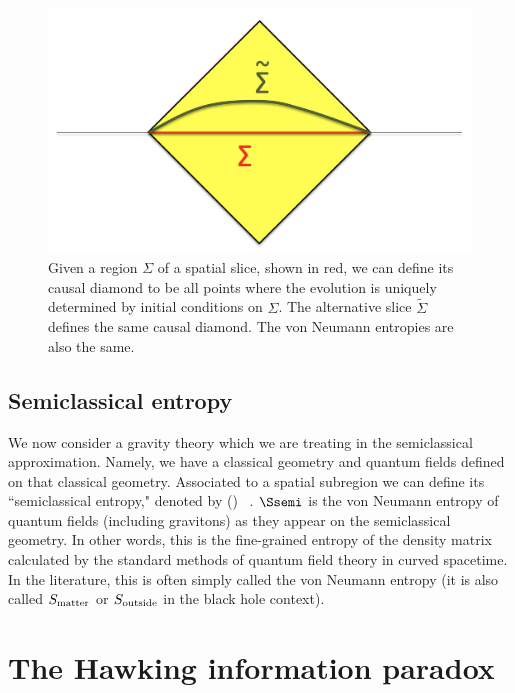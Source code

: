 \begin{figure}[h]
\begin{center}
\includegraphics[scale=.3]{figures/Diamond.png}
\caption{ Given a region $\Sigma$ of a spatial slice, shown in red, we can define its causal diamond to be all points where the evolution is uniquely  determined by initial conditions on $\Sigma$. The alternative slice $\tilde \Sigma$ defines the same causal diamond. The von Neumann entropies are also the same.  }
\label{Diamond}
\end{center}
\end{figure}




\subsection{Semiclassical entropy}\label{semiclassical}

We now consider a gravity theory which we are treating in the semiclassical approximation. Namely, we have a classical geometry and quantum fields defined on that classical geometry. 
Associated to a spatial subregion we can define its 
 ``semiclassical entropy,"    denoted by
\be
\Ssemi(\Sigma) \ .
\ee
$\Ssemi$ is the von Neumann entropy of quantum fields (including gravitons) as they appear on the semiclassical geometry. In other words, this is the fine-grained entropy of the density matrix calculated by the standard methods of quantum field theory in curved spacetime. In the literature, this is often simply called the von Neumann entropy (it is also called $S_{\rm matter}$ or $S_{\rm outside}$ in the black hole context).

 


\section{The Hawking information paradox }

